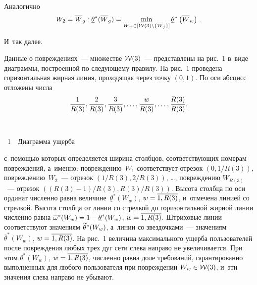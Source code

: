 \begin{multicols}{2}
Аналогично
$$
W_{2}= \overline {W}_g:  \underline {\theta}^*(\overline {W}_g) = 
 \min\limits_{\overline {W}_w \in [\overline {\cal W}(3) 
 \backslash \{\overline {W}_{j}\} ]} \underline {\theta}^*\left(\overline {W}_w\right)\,. 
 $$
 
 \vspace*{-3pt}

И~так далее.

Данные о повреждениях~--- множестве ${\cal W}(3)$~--- представлены на рис.~1 
в~виде диаграммы, построенной по следующему правилу. На рис.~1 
проведена горизонтальная жирная 
линия, проходящая через точку $(0, 1)$.
По оси абсцисс отложены числа
$$
 \displaystyle\frac{\displaystyle 1\mathstrut}{\displaystyle R(3)\mathstrut}, \displaystyle\frac{\displaystyle 2\mathstrut}{\displaystyle R(3)\mathstrut}, \displaystyle\frac{\displaystyle 3\mathstrut}{\displaystyle R(3)\mathstrut}, \ldots,  \displaystyle\frac{\displaystyle w\mathstrut}{\displaystyle R(3)\mathstrut}, \ldots,   
 \displaystyle\frac{\displaystyle R(3)\mathstrut}{\displaystyle R(3)\mathstrut},
 $$
 



 { \begin{center}  %
\vspace*{1pt}
\mbox{%
 \epsfxsize=71.885mm 
 }


\vspace*{6pt}


\noindent
{{\figurename~1}\ \ \small{Диаграмма ущерба}}
\end{center}
}



\vspace*{9pt}

\addtocounter{figure}{1}

 


\noindent
с~помощью которых определяется ширина столбцов, соответствующих номерам повреждений, 
а~именно:  повреждению~$W_1$ соответствует отрезок $(0, {1}/{R(3)})$, 
повреждению~$W_2$~--- отрезок 
$({1}/{R(3)}, {2}/{R(3)})$, \ldots, повреждению $W_{R(3)}$~--- 
отрезок  $({(R(3) - 1)}/{R(3)}, {R(3)}/R(3))$. 
Высота столбца по оси ординат численно равна величине~$\underline {\theta}^*(W_w)$, 
$w\hm = \overline{1, R(3)}$, и~отмечена линией со стрелкой.  Высота %
столбца от линии со стрелкой до горизонтальной жирной линии численно равна 
$\overline {\omega}^*(W_w) \hm= 1 \hm-   \underline {\theta}^*(W_w)$, 
$w \hm= \overline{1, R(3)}. $
Штриховые линии соответствуют значениям $\widetilde {\theta}^*(W_w)$,\linebreak 
а~линии со звездочками~--- значениям $\overline {\theta}^*(W_w)$, 
$w \hm= \overline{1, R(3)}$.
На  рис.~1 величина максимального ущерба пользователей после повреждения 
любых трех дуг сети слева направо не увеличивается. 
При этом $\underline {\theta}^*(W_w)$, $w \hm= \overline{1, R(3)}$, 
численно равна доле требований, гарантированно выполненных для 
любого пользователя при повреждении $W_w \hm\in  {\cal W}(3)$,  
и~эти значения слева направо не убывают.


\end{multicols}
